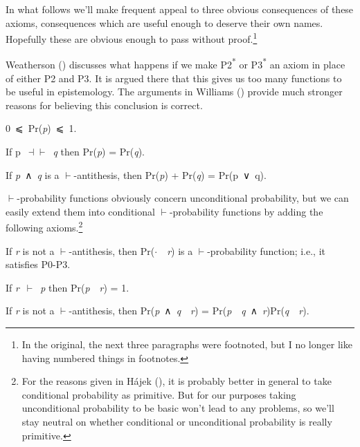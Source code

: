 \documentclass[
  11pt,
  letterpaper,
  DIV=11,
  numbers=noendperiod,
  twoside]{scrartcl}
\providecommand{\tightlist}{%
  \setlength{\itemsep}{0pt}\setlength{\parskip}{0pt}}
\begin{document}
In what follows we'll make frequent appeal to three obvious consequences
of these axioms, consequences which are useful enough to deserve their
own names. Hopefully these are obvious enough to pass without
proof.\footnote{In the original, the next three paragraphs were
  footnoted, but I no longer like having numbered things in footnotes.}

Weatherson () discusses what happens
if we make P2\textsuperscript{*} or P3\textsuperscript{*} an axiom in
place of either P2 and P3. It is argued there that this gives us too
many functions to be useful in epistemology. The arguments in Williams
() provide much stronger reasons for
believing this conclusion is correct.

\begin{description}
\tightlist
\item[(P1\textsuperscript{*})]
0~⩽~Pr(\emph{p})~⩽~1.
\item[(P2\textsuperscript{*})]
If p~\(\dashv \vdash\)~\emph{q} then Pr(\emph{p}) = Pr(\emph{q}).
\item[(P3\textsuperscript{*})]
If \emph{p}~∧~\emph{q} is a \(\vdash\)-antithesis, then Pr(\emph{p}) +
Pr(\emph{q}) = Pr(p~∨~q).
\end{description}

\(\vdash\)-probability functions obviously concern unconditional
probability, but we can easily extend them into conditional
\(\vdash\)-probability functions by adding the following
axioms.\footnote{For the reasons given in Hájek
  (), it is probably better in general to
  take conditional probability as primitive. But for our purposes taking
  unconditional probability to be basic won't lead to any problems, so
  we'll stay neutral on whether conditional or unconditional probability
  is really primitive.}

\begin{description}
\tightlist
\item[(P4)]
If \emph{r} is not a \(\vdash\)-antithesis, then
Pr(\(\cdot\)~\textbar~\emph{r}) is a \(\vdash\)-probability function;
i.e., it satisfies P0-P3.
\item[(P5)]
If \emph{r}~\(\vdash\)~\emph{p} then Pr(\emph{p}~\textbar~\emph{r}) = 1.
\item[(P6)]
If \emph{r} is not a \(\vdash\)-antithesis, then
Pr(\emph{p}~∧~\emph{q}~\textbar~\emph{r}) =
Pr(\emph{p}~\textbar~\emph{q}~∧~\emph{r})Pr(\emph{q}~\textbar~\emph{r}).
\end{description}
\end{document}
